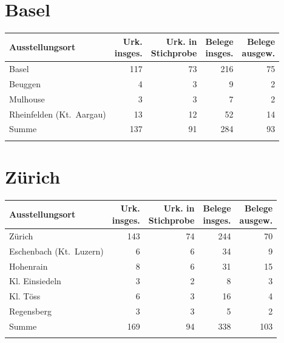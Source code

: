 \section{Basel}

\begin{tabularx}{\linewidth}{X r r r r}
\lsptoprule
Ausstellungsort
	& \makecell{Urk.\\ insges.}
	& \makecell{Urk. in\\ Stichprobe}
	& \makecell{Belege\\ insges.}
	& \makecell{Belege\\ ausgew.}
	\\
\midrule

Basel
	& 117
	& 73
	& 216
	& 75
	\\

Beuggen
	& 4
	& 3
	& 9
	& 2
	\\

Mulhouse
	& 3
	& 3
	& 7
	& 2
	\\

Rheinfelden (Kt.~Aargau)
	& 13
	& 12
	& 52
	& 14
	\\

\midrule

Summe
	& 137
	& 91
	& 284
	& 93
	\\

\lspbottomrule
\end{tabularx}

\section{Zürich}

\begin{tabularx}{\linewidth}{X r r r r}
\lsptoprule
Ausstellungsort
	& \makecell{Urk.\\ insges.}
	& \makecell{Urk. in\\ Stichprobe}
	& \makecell{Belege\\ insges.}
	& \makecell{Belege\\ ausgew.}
	\\
\midrule

Zürich
	& 143
	& 74
	& 244
	& 70
	\\

Eschenbach (Kt.~Luzern)
	& 6
	& 6
	& 34
	& 9
	\\

Hohenrain
	& 8
	& 6
	& 31
	& 15
	\\

Kl. Einsiedeln
	& 3
	& 2
	& 8
	& 3
	\\

Kl. Töss
	& 6
	& 3
	& 16
	& 4
	\\

Regensberg
	& 3
	& 3
	& 5
	& 2
	\\

\midrule

Summe
	& 169
	& 94
	& 338
	& 103
	\\

\lspbottomrule
\end{tabularx}

